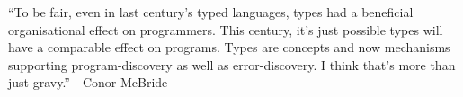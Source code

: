 ``To be fair, even in last century's typed languages, 
types had a beneficial organisational effect on programmers. 
This century, it's just possible types will have a comparable effect on programs. 
Types are concepts and now mechanisms supporting program-discovery as well as error-discovery. 
I think that's more than just gravy.''
 - Conor McBride

